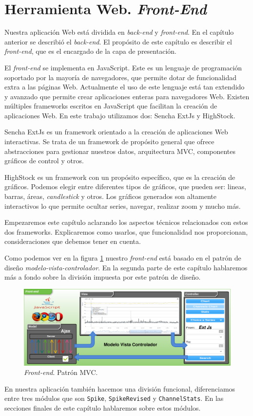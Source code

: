 \chapter{Herramienta Web. \emph{Front-End}}
\label{frontend}
Nuestra aplicación Web está dividida en \emph{back-end} y \emph{front-end}. En el capítulo anterior se describió el \emph{back-end}. El propósito de
este capítulo es describir el \emph{front-end}, que es el encargado de la capa de presentación.
\par
El \emph{front-end} se implementa en JavaScript\cite{JavaScript}. Este es un lenguaje de programación soportado por la mayoría de navegadores, que
permite dotar de funcionalidad extra a las páginas Web. Actualmente el uso de este lenguaje está tan extendido y avanzado que permite crear
aplicaciones enteras para navegadores Web. Existen múltiples frameworks escritos en JavaScript que facilitan la creación de aplicaciones Web. En este
trabajo utilizamos dos: Sencha ExtJs\cite{ExtJs} y HighStock\cite{HighStock}.
\par
Sencha ExtJs es un framework orientado a la creación de aplicaciones Web interactivas. Se trata de un framework de propósito general que ofrece
abstracciones para gestionar nuestros datos, arquitectura MVC, componentes gráficos de control y otros. 
\par
HighStock es un framework con un propósito específico, que es la creación de gráficos. Podemos elegir entre diferentes tipos de gráficos, que pueden
ser: lineas, barras, áreas, \emph{candlestick} y otros. Los gráficos generados son altamente interactivos lo que permite ocultar series, navegar,
realizar zoom y mucho más.
\par
Empezaremos este capítulo aclarando los aspectos técnicos relacionados con estos dos frameworks. Explicaremos como usarlos, que funcionalidad nos
proporcionan, consideraciones que debemos tener en cuenta.
\par
Como podemos ver en la figura \ref{frontend} nuestro \emph{front-end} está basado en el patrón de diseño
\emph{modelo-vista-controlador}\cite{MVCWiki}. En la segunda parte de este capítulo hablaremos más a fondo sobre la división impuesta por este patrón
de diseño.
\begin{figure}[h]
	\centering
	\includegraphics[keepaspectratio, width=1\textwidth]{./img/frontend.png}
	\caption{\emph{Front-end}. Patrón MVC.}   
	\label{fig:frontend}
\end{figure}
\par
En nuestra aplicación también hacemos una división funcional, diferenciamos entre tres módulos que son \texttt{Spike}, \texttt{SpikeRevised} y
\texttt{ChannelStats}. En las secciones finales de este capítulo hablaremos sobre estos módulos. 

